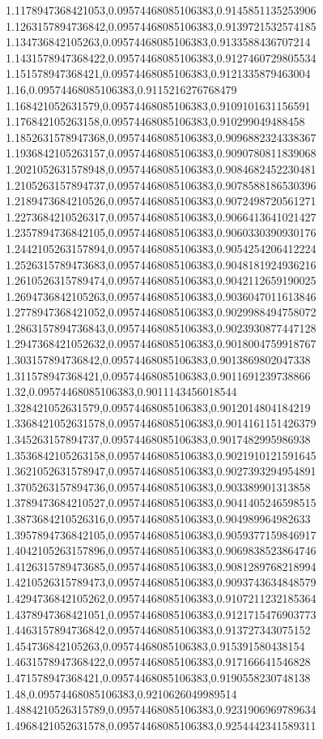 1.1178947368421053,0.09574468085106383,0.9145851135253906
1.1263157894736842,0.09574468085106383,0.9139721532574185
1.134736842105263,0.09574468085106383,0.9133588436707214
1.1431578947368422,0.09574468085106383,0.9127460729805534
1.151578947368421,0.09574468085106383,0.9121335879463004
1.16,0.09574468085106383,0.9115216276768479
1.168421052631579,0.09574468085106383,0.9109101631156591
1.176842105263158,0.09574468085106383,0.910299049488458
1.1852631578947368,0.09574468085106383,0.9096882324338367
1.1936842105263157,0.09574468085106383,0.9090780811839068
1.2021052631578948,0.09574468085106383,0.9084682452230481
1.2105263157894737,0.09574468085106383,0.9078588186530396
1.2189473684210526,0.09574468085106383,0.9072498720561271
1.2273684210526317,0.09574468085106383,0.9066413641021427
1.2357894736842105,0.09574468085106383,0.9060330390930176
1.2442105263157894,0.09574468085106383,0.9054254206412224
1.2526315789473683,0.09574468085106383,0.9048181924936216
1.2610526315789474,0.09574468085106383,0.9042112659190025
1.2694736842105263,0.09574468085106383,0.9036047011613846
1.2778947368421052,0.09574468085106383,0.9029988494758072
1.2863157894736843,0.09574468085106383,0.9023930877447128
1.2947368421052632,0.09574468085106383,0.9018004759918767
1.303157894736842,0.09574468085106383,0.9013869802047338
1.311578947368421,0.09574468085106383,0.9011691239738866
1.32,0.09574468085106383,0.9011143456018544
1.328421052631579,0.09574468085106383,0.9012014804184219
1.3368421052631578,0.09574468085106383,0.9014161151426379
1.345263157894737,0.09574468085106383,0.9017482995986938
1.3536842105263158,0.09574468085106383,0.9021910121591645
1.3621052631578947,0.09574468085106383,0.9027393294954891
1.3705263157894736,0.09574468085106383,0.903389901313858
1.3789473684210527,0.09574468085106383,0.9041405246598515
1.3873684210526316,0.09574468085106383,0.904989964982633
1.3957894736842105,0.09574468085106383,0.9059377159846917
1.4042105263157896,0.09574468085106383,0.9069838523864746
1.4126315789473685,0.09574468085106383,0.9081289768218994
1.4210526315789473,0.09574468085106383,0.9093743634848579
1.4294736842105262,0.09574468085106383,0.9107211232185364
1.4378947368421051,0.09574468085106383,0.9121715476903773
1.4463157894736842,0.09574468085106383,0.913727343075152
1.454736842105263,0.09574468085106383,0.915391580438154
1.4631578947368422,0.09574468085106383,0.917166641546828
1.471578947368421,0.09574468085106383,0.9190558230748138
1.48,0.09574468085106383,0.9210626049989514
1.4884210526315789,0.09574468085106383,0.9231906969789634
1.4968421052631578,0.09574468085106383,0.9254442341589311
